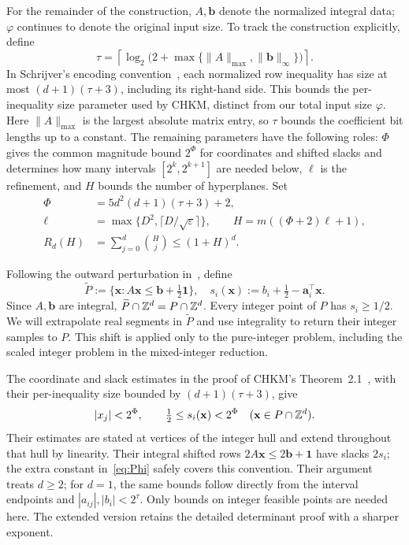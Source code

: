 \documentclass[final,5p,times,twocolumn]{elsarticle}
\theoremstyle{definition}\newtheorem{definition}{Definition}[section]
\theoremstyle{remark}\newtheorem{remark}[theorem]{Remark}
\newcommand{\eps}{\varepsilon}
\begin{document}
For the remainder of the construction, $A,\mathbf b$ denote the normalized integral data; $\varphi$ continues to denote the original input size. To track the construction explicitly, define
\begin{equation}\label{eq:tau}
 \tau=\left\lceil\log_2\bigl(2+\max\{\|A\|_{\max},\|\mathbf b\|_\infty\}\bigr)\right\rceil.
\end{equation}
In Schrijver's encoding convention~\cite[Section~2.1]{Schrijver}, each normalized row inequality has size at most $(d+1)(\tau+3)$, including its right-hand side. This bounds the per-inequality size parameter used by CHKM, distinct from our total input size $\varphi$. Here $\|A\|_{\max}$ is the largest absolute matrix entry, so $\tau$ bounds the coefficient bit lengths up to a constant. The remaining parameters have the following roles: $\Phi$ gives the common magnitude bound $2^\Phi$ for coordinates and shifted slacks and determines how many intervals $[2^k,2^{k+1}]$ are needed below, $\ell$ is the refinement, and $H$ bounds the number of hyperplanes. Set
\begin{align}
 \Phi&=5d^2(d+1)(\tau+3)+2,\label{eq:Phi}\\
 \ell&=\max\{D^2,\lceil D/\sqrt\eps\rceil\},\qquad H=m((\Phi+2)\ell+1),\label{eq:HT}\\
 R_d(H)&=\sum_{j=0}^{d}\binom Hj\le(1+H)^d.\label{eq:F}
\end{align}

Following the outward perturbation in~\cite[proof of Theorem~2.1, p.~29]{CHKM}, define
\[
 \widetilde P:=\{\mathbf{x}:A\mathbf{x}\le\mathbf b+\tfrac12\mathbf1\},\quad
 s_i(\mathbf{x}):=b_i+\tfrac12-\mathbf a_i^\top\mathbf{x}.
\]
Since $A,\mathbf b$ are integral, $\widetilde P\cap\mathbb Z^d=P\cap\mathbb Z^d$. Every integer point of $P$ has $s_i\ge1/2$. We will extrapolate real segments in $\widetilde P$ and use integrality to return their integer samples to $P$. This shift is applied only to the pure-integer problem, including the scaled integer problem in the mixed-integer reduction.

The coordinate and slack estimates in the proof of CHKM's Theorem~2.1~\cite[p.~29]{CHKM}, with their per-inequality size bounded by $(d+1)(\tau+3)$, give
\begin{equation}\label{eq:integer-bounds}
 |x_j|<2^\Phi,\qquad \tfrac12\le s_i(\mathbf{x})<2^\Phi
 \quad(\mathbf{x}\in P\cap\mathbb Z^d).
\end{equation}
Their estimates are stated at vertices of the integer hull and extend throughout that hull by linearity. Their integral shifted rows $2A\mathbf{x}\le2\mathbf b+\mathbf1$ have slacks $2s_i$; the extra constant in~\eqref{eq:Phi} safely covers this convention. Their argument treats $d\ge2$; for $d=1$, the same bounds follow directly from the interval endpoints and $|a_{ij}|,|b_i|<2^\tau$. Only bounds on integer feasible points are needed here. The extended version retains the detailed determinant proof with a sharper exponent.
\end{document}

